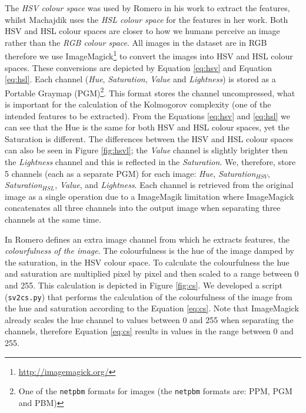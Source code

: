 \documentclass[11pt,a4paper,twoside,openright]{report}
\begin{document}
The \emph{HSV colour space} was used by Romero \cite{jma12clas} in his work to
extract the features, whilst Machajdik \cite{mach10clas} uses the \emph{HSL
colour space} for the features in her work.  Both HSV and HSL colour spaces are
closer to how we humans perceive an image rather than the \emph{RGB colour
space}.  All images in the dataset are in RGB therefore we use
ImageMagick\footnote{ \href{http://imagemagick.org/}{http://imagemagick.org/} }
to convert the images into HSV and HSL colour spaces.  These conversions are
depicted by Equation \ref{eq:hsv} and Equation \ref{eq:hsl}.  Each channel
(\emph{Hue}, \emph{Saturation}, \emph{Value} and \emph{Lightness}) is stored as
a Portable Graymap (PGM)\footnote{One of the \texttt{netpbm} formats for images
(the \texttt{netpbm} formats are: PPM, PGM and PBM)}.  This format stores the
channel uncompressed, what is important for the calculation of the Kolmogorov
complexity (one of the intended features to be extracted).  From the Equations
\ref{eq:hsv} and \ref{eq:hsl} we can see that the Hue is the same for both HSV
and HSL colour spaces, yet the Saturation is different.  The differences
between the HSV and HSL colour spaces can also be seen in Figure
\ref{fig:hsvl}; the \emph{Value} channel is slightly brighter then the
\emph{Lightness} channel and this is reflected in the \emph{Saturation}.  We,
therefore, store 5 channels (each as a separate PGM) for each image:
\emph{Hue}, \emph{Saturation$_{HSV}$}, \emph{Saturation$_{HSL}$}, \emph{Value},
and \emph{Lightness}.  Each channel is retrieved from the original image as a
single operation due to a ImageMagik limitation where ImageMagick concatenates
all three channels into the output image when separating three channels at the
same time.

In \cite{rmc12ajs} Romero defines an extra image channel from which he extracts
features, the \emph{colourfulness of the image}.  The colourfulness is the hue
of the image damped by the saturation, in the HSV colour space.  To calculate
the colourfulness the hue and saturation are multiplied pixel by pixel and then
scaled to a range between 0 and 255.  This calculation is depicted in Figure
\ref{fig:cs}.  We developed a script (\texttt{sv2cs.py}) that performs the
calculation of the colourfulness of the image from the hue and saturation
according to the Equation \ref{eq:cs}.  Note that ImageMagick already scales
the hue channel to values between 0 and 255 when separating the channels,
therefore Equation \ref{eq:cs} results in values in the range between 0 and
255.
\end{document}
